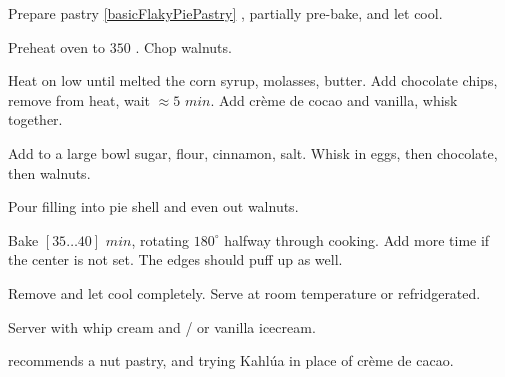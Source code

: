 \begin{preparation}
\item Prepare pastry \ref{basicFlakyPiePastry} , partially pre-bake, and let cool.
\item Preheat oven to $350$ \Fahrenheit.
	Chop walnuts.
\item Heat on low until melted the corn syrup, molasses, butter.
	Add chocolate chips, remove from heat, wait $\approx 5$ $min$.
	Add cr\`{e}me de cocao and vanilla, whisk together.
\item Add to a large bowl sugar, flour, cinnamon, salt.
	Whisk in eggs, then chocolate, then walnuts.
\item Pour filling into pie shell and even out walnuts.
\item Bake $[35 \dots 40]$ $min$, rotating $180^\circ$ halfway through cooking.
	Add more time if the center is not set.
	The edges should puff up as well.
\item Remove and let cool completely.
	Serve at room temperature or refridgerated.
\end{preparation}

\begin{variation}
	\item Server with whip cream and / or vanilla icecream.
	\item \citeauthor{pie2004} \cite{pie2004} recommends a nut pastry, and trying Kahl\'{u}a in place of cr\`{e}me de cacao.
\end{variation}

\recipeend
